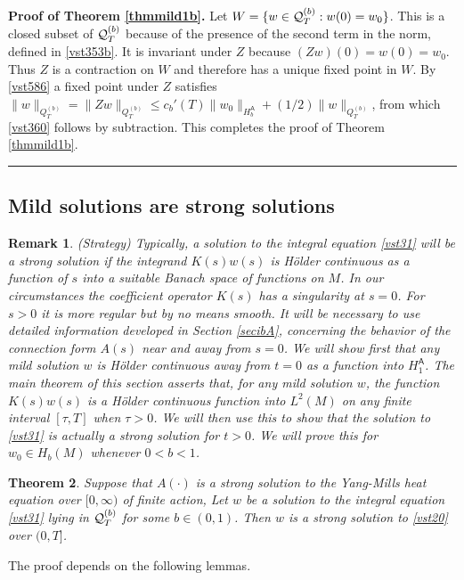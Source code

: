 \documentclass[12pt]{article}
\newtheorem{theorem}{Theorem}[section]
\newtheorem{remark}[theorem]{Remark}
\newenvironment{proof}[1][Proof]{\textbf{#1.} }{\ \rule{0.5em}{0.5em}}
\def \As{\mathsf{A}}
\def \Q{{\cal Q}}
\def \eref{\eqref}
\numberwithin{equation}{section}
\begin{document}
\begin{proof}[Proof of Theorem \ref{thmmild1b}]
Let $W = \{w \in \Q_T^{(b)}: w(0) = w_0\}$. 
This is a closed subset of $ \Q_T^{(b)}$ because  of the presence of the second term
 in the norm, defined in  \eref{vst353b}. It is invariant under $Z$ because 
 $(Zw)(0) = w(0) = w_0.$
Thus $Z$ is a contraction on $W$ and therefore has a unique fixed point in $W$. 
By \eref{vst586} a fixed point under $Z$ satisfies
 $\| w\|_{Q_T^{(b)}} = \| Z w\|_{Q_T^{(b)}} \le c_b'(T) \| w_0 \|_{H_b^\As} + (1/2) \|w\|_{Q_T^{(b)}}$,
 from which  \eref{vst360} follows by subtraction.
 This completes the proof of  Theorem \ref{thmmild1b}.  
 \end{proof}
 


\subsection{Mild solutions are strong solutions} \label{secmildstr} 
  
 \begin{remark}\label{strat6} {\rm (Strategy)    
  Typically, a solution to the integral equation \eref{vst31}
will be a strong solution if the integrand $K(s) w(s)$ is H\"older continuous as a function
of $s$ into a suitable Banach space of functions on $M$. 
In our circumstances the coefficient operator $K(s)$ has a singularity at $s=0$.
For $s>0$ it is more regular but by no means smooth. It will be necessary to use
detailed information developed in Section \ref{secibA},
 concerning the behavior of the
 connection form $A(s)$ near and away from $s =0$.
 We will show first that any mild solution
 $w$ is H\"older continuous away from $t=0$ as a function into $H_1^\As$. 
   The main theorem of this section asserts that, for any mild solution $w$, 
  the function $K(s)w(s)$ is a H\"older continuous
 function into $L^2(M)$    
  on any finite interval $[\tau,T]$ when $\tau >0$.
  We will then  use this
   to show that the  solution to \eref{vst31} 
is actually a strong solution for $t> 0$. We will prove this for $w_0 \in H_b(M)$ whenever $0 < b <1$.
}
\end{remark}

 
\begin{theorem}\label{thmstrong}  
Suppose that $A(\cdot)$ is a strong solution to the Yang-Mills heat
 equation over $[0, \infty)$  of finite  action,
 Let $w$ be a solution to the integral equation
 \eref{vst31} lying in
  $\Q_T^{(b)}$ for some $b \in (0,1)$. Then $w$ is a strong solution  to \eref{vst20} over
 $(0,T]$.   
 
  \end{theorem}
 The proof depends on the following lemmas.
\end{document}

